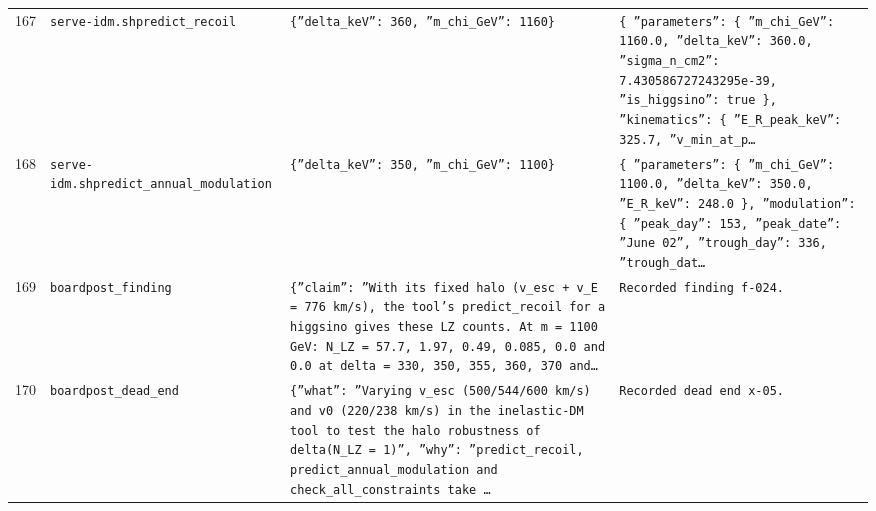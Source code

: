 \documentclass[11pt,a4paper]{article}
\begin{document}
\begin{longtable}{@{}p{}p{}p{}p{}@{}}
167 & \texttt{serve-idm.sh}\newline\texttt{predict\_\allowbreak{}recoil} & \texttt{\{''delta\_\allowbreak{}keV'':\allowbreak{} 360,\allowbreak{} ''m\_\allowbreak{}chi\_\allowbreak{}GeV'':\allowbreak{} 1160\}\allowbreak{}} & \texttt{\{   ''parameters'':\allowbreak{} \{     ''m\_\allowbreak{}chi\_\allowbreak{}GeV'':\allowbreak{} 1160.0,\allowbreak{}     ''delta\_\allowbreak{}keV'':\allowbreak{} 360.0,\allowbreak{}     ''sigma\_\allowbreak{}n\_\allowbreak{}cm2'':\allowbreak{} 7.430586727243295e-39,\allowbreak{}     ''is\_\allowbreak{}higgsino'':\allowbreak{} true   \}\allowbreak{},\allowbreak{}   ''kinematics'':\allowbreak{} \{     ''E\_\allowbreak{}R\_\allowbreak{}peak\_\allowbreak{}keV'':\allowbreak{} 325.7,\allowbreak{}     ''v\_\allowbreak{}min\_\allowbreak{}at\_\allowbreak{}p\ldots{}\allowbreak{}} \\
168 & \texttt{serve-idm.sh}\newline\texttt{predict\_\allowbreak{}annual\_\allowbreak{}modulation} & \texttt{\{''delta\_\allowbreak{}keV'':\allowbreak{} 350,\allowbreak{} ''m\_\allowbreak{}chi\_\allowbreak{}GeV'':\allowbreak{} 1100\}\allowbreak{}} & \texttt{\{   ''parameters'':\allowbreak{} \{     ''m\_\allowbreak{}chi\_\allowbreak{}GeV'':\allowbreak{} 1100.0,\allowbreak{}     ''delta\_\allowbreak{}keV'':\allowbreak{} 350.0,\allowbreak{}     ''E\_\allowbreak{}R\_\allowbreak{}keV'':\allowbreak{} 248.0   \}\allowbreak{},\allowbreak{}   ''modulation'':\allowbreak{} \{     ''peak\_\allowbreak{}day'':\allowbreak{} 153,\allowbreak{}     ''peak\_\allowbreak{}date'':\allowbreak{} ''June 02'',\allowbreak{}     ''trough\_\allowbreak{}day'':\allowbreak{} 336,\allowbreak{}     ''trough\_\allowbreak{}dat\ldots{}\allowbreak{}} \\
169 & \texttt{board}\newline\texttt{post\_\allowbreak{}finding} & \texttt{\{''claim'':\allowbreak{} ''With its fixed halo (v\_\allowbreak{}esc + v\_\allowbreak{}E =\allowbreak{} 776 km/\allowbreak{}s)\allowbreak{},\allowbreak{} the tool's predict\_\allowbreak{}recoil for a higgsino gives these LZ counts. At m =\allowbreak{} 1100 GeV:\allowbreak{} N\_\allowbreak{}LZ =\allowbreak{} 57.7,\allowbreak{} 1.97,\allowbreak{} 0.49,\allowbreak{} 0.085,\allowbreak{} 0.0 and 0.0 at delta =\allowbreak{} 330,\allowbreak{} 350,\allowbreak{} 355,\allowbreak{} 360,\allowbreak{} 370 and\ldots{}\allowbreak{}} & \texttt{Recorded finding f-024.} \\
170 & \texttt{board}\newline\texttt{post\_\allowbreak{}dead\_\allowbreak{}end} & \texttt{\{''what'':\allowbreak{} ''Varying v\_\allowbreak{}esc (500/\allowbreak{}544/\allowbreak{}600 km/\allowbreak{}s)\allowbreak{} and v0 (220/\allowbreak{}238 km/\allowbreak{}s)\allowbreak{} in the inelastic-DM tool to test the halo robustness of delta(N\_\allowbreak{}LZ =\allowbreak{} 1)\allowbreak{}'',\allowbreak{} ''why'':\allowbreak{} ''predict\_\allowbreak{}recoil,\allowbreak{} predict\_\allowbreak{}annual\_\allowbreak{}modulation and check\_\allowbreak{}all\_\allowbreak{}constraints take \ldots{}\allowbreak{}} & \texttt{Recorded dead end x-05.} \\

\end{longtable}
\end{document}
